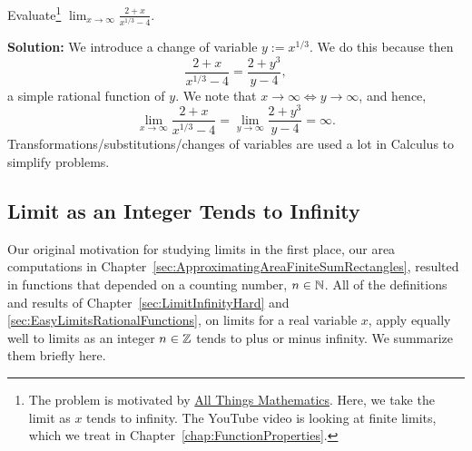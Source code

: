 \Qed

\bigskip 


\begin{center}
\setlength{\fboxrule}{2pt} %
\setlength{\fboxsep}{10pt} %
\end{center}

\bigskip

\begin{example} Evaluate\footnote{The problem is motivated by \href{https://youtu.be/c9lqprmHtzU}{All Things Mathematics}. Here, we take the limit as $x$ tends to infinity. The YouTube video is looking at finite limits, which we treat in Chapter~\ref{chap:FunctionProperties}.} $\displaystyle \lim_{x \to \infty} \frac{ 2 + x}{x^{1/3} - 4}$.  
    
\end{example}

\textbf{Solution:} We introduce a change of variable $y := x^{1/3}$. We do this because then
$$\frac{ 2 + x}{x^{1/3} - 4} = \frac{ 2 + y^3}{y - 4},$$
a simple rational function of $y$. We note that $x \to \infty \iff y \to \infty$, and hence,
$$\lim_{x \to \infty} \frac{ 2 + x}{x^{1/3} - 4} = \lim_{y \to \infty} \frac{ 2 + y^3}{y - 4} = \infty.$$
Transformations/substitutions/changes of variables are used a lot in Calculus to simplify problems. 
\Qed


\subsection{Limit as an Integer Tends to Infinity}

Our original motivation for studying limits in the first place, our area computations in Chapter~\ref{sec:ApproximatingAreaFiniteSumRectangles}, resulted in functions that depended on a counting number, $n \in \mathbb N$. All of the definitions and results of Chapter~\ref{sec:LimitInfinityHard} and \ref{sec:EasyLimitsRationalFunctions}, on limits for a real variable $x$, apply equally well to limits as an integer $n\in \mathbb Z$ tends to plus or minus infinity. We summarize them briefly here. 

\begin{center}
\setlength{\fboxrule}{2pt} %
\setlength{\fboxsep}{10pt} %
\end{center}

